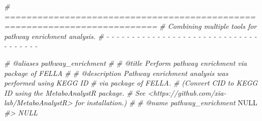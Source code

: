\documentclass[
]{article}
\newenvironment{Shaded}{\begin{snugshade}}{\end{snugshade}}
\newcommand{\CommentTok}[1]{\textcolor[rgb]{0.56,0.35,0.01}{\textit{#1}}}
\newcommand{\ConstantTok}[1]{\textcolor[rgb]{0.00,0.00,0.00}{#1}}
\begin{document}
\begin{Shaded}
\begin{Highlighting}[]
\CommentTok{\# ==========================================================================}
\CommentTok{\# Combining multiple tools for pathway enrichment analysis.}
\CommentTok{\# {-} {-} {-} {-} {-} {-} {-} {-} {-} {-} {-} {-} {-} {-} {-} {-} {-} {-} {-} {-} {-} {-} {-} {-} {-} {-} {-} {-} {-} {-} {-} {-} {-} {-} {-} {-} {-}}

\CommentTok{\#\textquotesingle{} @aliases pathway\_enrichment}
\CommentTok{\#\textquotesingle{}}
\CommentTok{\#\textquotesingle{} @title Perform pathway enrichment via package of \textquotesingle{}FELLA\textquotesingle{}}
\CommentTok{\#\textquotesingle{}}
\CommentTok{\#\textquotesingle{} @description Pathway enrichment analysis was performed using KEGG ID}
\CommentTok{\#\textquotesingle{} via package of \textquotesingle{}FELLA\textquotesingle{}.}
\CommentTok{\#\textquotesingle{} (Convert CID to KEGG ID using the \textquotesingle{}MetaboAnalystR\textquotesingle{} package.}
\CommentTok{\#\textquotesingle{} See \textless{}https://github.com/xia{-}lab/MetaboAnalystR\textgreater{} for installation.)}
\CommentTok{\#\textquotesingle{}}
\CommentTok{\#\textquotesingle{} @name pathway\_enrichment}
\ConstantTok{NULL}
\CommentTok{\#\textgreater{} NULL}


\end{Highlighting}
\end{Shaded}
\end{document}
